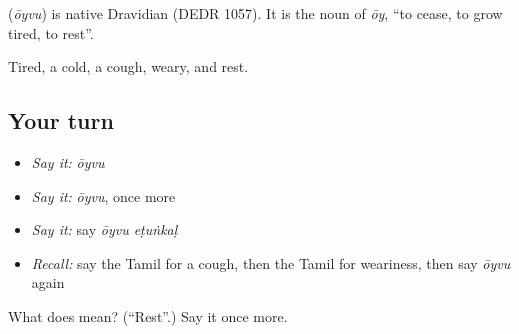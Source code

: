 \begin{cousinweb}
\textbf{} (\emph{ōyvu}) is native Dravidian (DEDR 1057). It is the noun of \emph{ōy}, \textquotedblleft{}to cease, to grow tired, to rest\textquotedblright{}.
\end{cousinweb}

\begin{grammarlens}[title={What you've built}]
Tired, a cold, a cough, weary, and rest.
\end{grammarlens}

\subsection*{Your turn}
\begin{itemize}
\raggedright
  \item \emph{Say it:} \emph{ōyvu}
  \item \emph{Say it:} \emph{ōyvu}, once more
  \item \emph{Say it:} say \emph{ōyvu eṭuṅkaḷ}
  \item \emph{Recall:} say the Tamil for a cough, then the Tamil for weariness, then say \emph{ōyvu} again
\end{itemize}

\begin{tcolorbox}[breakable,colback=teal!4,colframe=teal!35!black,title={Before you move on}]
What does  mean? (\textquotedblleft{}Rest\textquotedblright{}.) Say it once more.
\end{tcolorbox}
